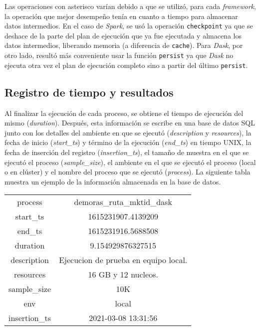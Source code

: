 Las operaciones con asterisco varían debido a que se utilizó, para cada \textit{framework}, la operación que mejor desempeño tenía en cuanto a tiempo para almacenar datos intermedios. En el caso de \textit{Spark}, se usó la operación \texttt{checkpoint} ya que se deshace de la parte del plan de ejecución que ya fue ejecutada y almacena los datos intermedios, liberando memoria (a diferencia de \texttt{cache}). Para \textit{Dask}, por otro lado, resultó más conveniente usar la función \texttt{persist} ya que \textit{Dask} no ejecuta otra vez el plan de ejecución completo sino a partir del último \texttt{persist}.

\subsection{Registro de tiempo y resultados}

Al finalizar la ejecución de cada proceso, se obtiene el tiempo de ejecución del mismo (\textit{duration}). Después, esta información se escribe en una base de datos SQL junto con los detalles del ambiente en que se ejecutó (\textit{description} y \textit{resources}), la fecha de inicio (\textit{start\_ts}) y término de la ejecución (\textit{end\_ts}) en tiempo UNIX, la fecha de inserción del registro (\textit{insertion\_ts}), el tamaño de muestra en el que se ejecutó el proceso (\textit{sample\_size}), el ambiente en el que se ejecutó el proceso (local o en clúster) y el nombre del proceso que se ejecutó (\textit{process}). La siguiente tabla muestra un ejemplo de la información almacenada en la base de datos.

\begin{center}
\begin{tabular}{|c|c|}
 \hline
  process & demoras\_ruta\_mktid\_dask \\ 
  start\_ts & 1615231907.4139209 \\
  end\_ts & 1615231916.5688508 \\ 
  duration & 9.154929876327515 \\ 
  description & Ejecucion de prueba en equipo local. \\
  resources & 16 GB y 12 nucleos. \\
  sample\_size & 10K \\
  env & local \\
  insertion\_ts & 2021-03-08 13:31:56 \\
  \hline
\end{tabular}
\end{center}



